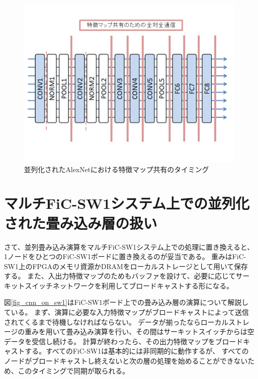\begin{figure}[ht]  
 \begin{center}   
	\includegraphics[width=1.0\columnwidth,bb=0 0 720 540]{img/cnn_broadcast.png}
  \caption{並列化されたAlexNetにおける特徴マップ共有のタイミング}
  \label{fig_cnn_broadcast}  
 \end{center}  
\end{figure}

\section{マルチFiC-SW1システム上での並列化された畳み込み層の扱い}
さて、並列畳み込み演算をマルチFiC-SW1システム上での処理に置き換えると、1ノードをひとつのFiC-SW1ボードに置き換えるのが妥当である。
重みはFiC-SW1上のFPGAのメモリ資源かDRAMをローカルストレージとして用いて保存する。
また、入出力特徴マップのためもバッファを設けて、必要に応じてサーキットスイッチネットワークを利用してブロードキャストする形になる。

図\ref{fig_cnn_on_sw1}はFiC-SW1ボード上での畳み込み層の演算について解説している。
まず、演算に必要な入力特徴マップがブロードキャストによって送信されてくるまで待機しなければならない。
データが揃ったならローカルストレージの重みを用いて畳み込み演算を行い、その間はサーキットスイッチからは空データを受信し続ける。
計算が終わったら、その出力特徴マップをブロードキャストする。すべてのFiC-SW1は基本的には非同期的に動作するが、
すべてのノードがブロードキャストし終えないと次の層の処理を始めることができないため、このタイミングで同期が取られる。

